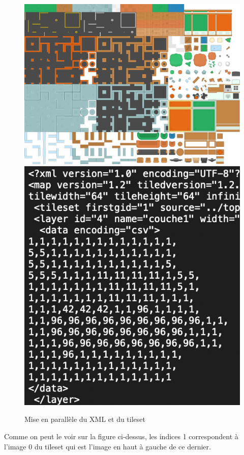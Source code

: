 \documentclass[a4paper,12pt]{article} %
\begin{document}
\begin{figure}[!h]
\centering
\includegraphics[scale=0.12]{images/tileset.png}
\includegraphics[scale=0.5]{images/XML.png}
\caption{Mise en parallèle du XML et du tileset}
\end{figure}
\newline
Comme on peut le voir sur la figure ci-dessus, les indices 1 correspondent à l'image 0 du tileset qui est l'image en haut à gauche de ce dernier.
\end{document}
